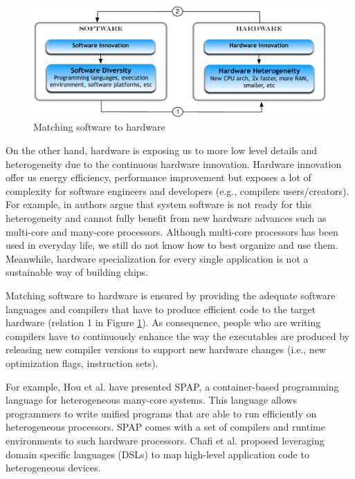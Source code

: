 \begin{figure}[h]
	\center
	\includegraphics[scale=0.65]{Background/fig/marriage}
	\caption{Matching software to hardware}
	\label{fig:marriage}
\end{figure}

On the other hand, hardware is exposing us to more low level details and heterogeneity due to the continuous hardware innovation. 
Hardware innovation offer us energy efficiency, performance improvement but exposes a lot of complexity for software engineers and developers (e.g., compilers users/creators).
For example, in \cite{he2010computer} authors argue that system software is not ready for this heterogeneity and cannot fully benefit from new hardware advances such as multi-core and many-core processors. Although multi-core processors has been used in everyday life, we still do not know how to best organize and use them. 
Meanwhile, hardware specialization for every single application is not a sustainable way of building chips.

Matching software to hardware is ensured by providing the adequate software languages and compilers that have to produce efficient code to the target hardware (relation 1 in Figure \ref{fig:marriage}). As consequence, people who are writing compilers have to continuously enhance the way the executables are produced by releasing new compiler versions to support new hardware changes (i.e., new optimization flags, instruction sets).

For example, Hou et al.\cite{hou2010spap} have presented SPAP, a container-based programming language for heterogeneous many-core systems. This language allows programmers to write unified programs that are able to run efficiently on heterogeneous processors. SPAP comes with a set of compilers and runtime environments to such hardware processors. Chafi et al.\cite{chafi2010language,chafi2011domain} proposed leveraging domain specific languages (DSLs) to map high-level application code to
heterogeneous devices.


